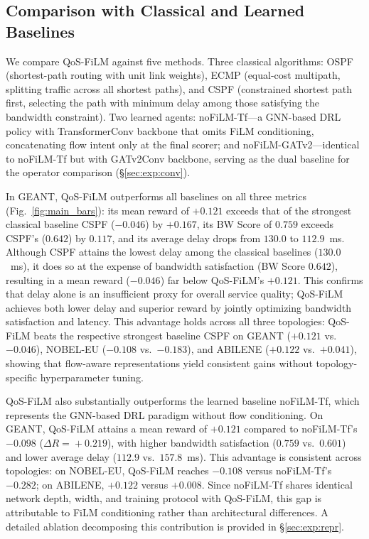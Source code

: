 \subsection{Comparison with Classical and Learned Baselines}
\label{sec:exp:main}

We compare QoS-FiLM against five methods. Three classical algorithms: OSPF (shortest-path routing with unit link weights), ECMP (equal-cost multipath, splitting traffic across all shortest paths), and CSPF (constrained shortest path first, selecting the path with minimum delay among those satisfying the bandwidth constraint). Two learned agents: noFiLM-Tf---a GNN-based DRL policy with TransformerConv backbone that omits FiLM conditioning, concatenating flow intent only at the final scorer; and noFiLM-GATv2---identical to noFiLM-Tf but with GATv2Conv backbone, serving as the dual baseline for the operator comparison (\S\ref{sec:exp:conv}). 

In GEANT, QoS-FiLM outperforms all baselines on all three metrics (Fig.~\ref{fig:main_bars}): its mean reward of $+0.121$ exceeds that of the strongest classical baseline CSPF ($-0.046$) by $+0.167$, its BW Score of $0.759$ exceeds CSPF's ($0.642$) by $0.117$, and its average delay drops from $130.0$ to $112.9$~ms.
Although CSPF attains the lowest delay among the classical baselines ($130.0$~ms), it does so at the expense of bandwidth satisfaction (BW Score $0.642$), resulting in a mean reward ($-0.046$) far below QoS-FiLM's $+0.121$.
This confirms that delay alone is an insufficient proxy for overall service quality; QoS-FiLM achieves both lower delay and superior reward by jointly optimizing bandwidth satisfaction and latency.
This advantage holds across all three topologies: QoS-FiLM beats the respective strongest baseline CSPF on GEANT ($+0.121$ vs.\ $-0.046$), NOBEL-EU ($-0.108$ vs.\ $-0.183$), and ABILENE ($+0.122$ vs.\ $+0.041$), showing that flow-aware representations yield consistent gains without topology-specific hyperparameter tuning. 

QoS-FiLM also substantially outperforms the learned baseline noFiLM-Tf, which represents the GNN-based DRL paradigm without flow conditioning. On GEANT, QoS-FiLM attains a mean reward of $+0.121$ compared to noFiLM-Tf's $-0.098$ ($\Delta R\!=\!+0.219$), with higher bandwidth satisfaction ($0.759$ vs.\ $0.601$) and lower average delay ($112.9$ vs.\ $157.8$~ms). This advantage is consistent across topologies: on NOBEL-EU, QoS-FiLM reaches $-0.108$ versus noFiLM-Tf's $-0.282$; on ABILENE, $+0.122$ versus $+0.008$. Since noFiLM-Tf shares identical network depth, width, and training protocol with QoS-FiLM, this gap is attributable to FiLM conditioning rather than architectural differences. A detailed ablation decomposing this contribution is provided in \S\ref{sec:exp:repr}.

